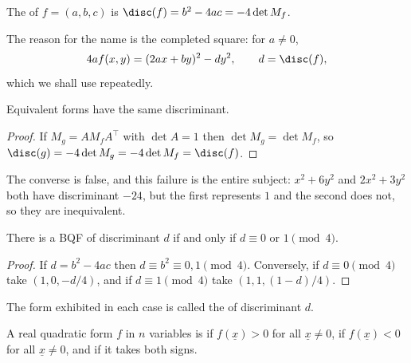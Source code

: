 \begin{definition}
	The  of $f = (a,b,c)$ is $\disc(f) = b^2 - 4ac = -4\det M_f$.
\end{definition}

The reason for the name is the completed square: for $a \neq 0$,
$$
4af(x,y) = (2ax + by)^2 - dy^2, \qquad d = \disc(f),
$$
which we shall use repeatedly.

\begin{lemma}
	Equivalent forms have the same discriminant.
\end{lemma}
\begin{proof}
	If $M_g = AM_fA^\intercal$ with $\det A = 1$ then $\det M_g = \det M_f$, so $\disc(g) = -4\det M_g = -4\det M_f = \disc(f)$.
\end{proof}

The converse is false, and this failure is the entire subject: $x^2 + 6y^2$ and $2x^2 + 3y^2$ both have discriminant $-24$, but the first represents $1$ and the second does not, so they are inequivalent.

\begin{lemma}
	There is a BQF of discriminant $d$ if and only if $d \equiv 0$ or $1 \pmod 4$.
\end{lemma}
\begin{proof}
	If $d = b^2 - 4ac$ then $d \equiv b^2 \equiv 0, 1 \pmod 4$. Conversely, if $d \equiv 0 \pmod 4$ take $(1, 0, -d/4)$, and if $d \equiv 1 \pmod 4$ take $(1, 1, (1-d)/4)$.
\end{proof}

The form exhibited in each case is called the  of discriminant $d$.

\begin{definition}
	A real quadratic form $f$ in $n$ variables is  if $f(\underline x) > 0$ for all $\underline x \neq 0$,  if $f(\underline x) < 0$ for all $\underline x \neq 0$, and  if it takes both signs.
\end{definition}

